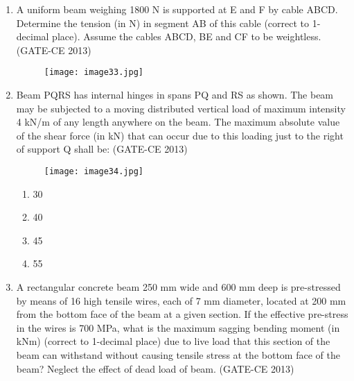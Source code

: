 \documentclass[journal,12pt,onecolumn]{article}
\theoremstyle{remark}
\begin{document}
\begin{enumerate}
    \item A uniform beam weighing 1800 N is supported at E and F by cable ABCD. Determine the tension (in N) in segment AB of this cable (correct to 1-decimal place). Assume the cables ABCD, BE and CF to be weightless. \underline{\hspace{3cm}} (GATE-CE 2013)
    
    \begin{figure}[H]
    \centering
    \texttt{[image: image33.jpg]}  
    \caption{}
    \label{fig:4}
    \end{figure}
    
    \item Beam PQRS has internal hinges in spans PQ and RS as shown. The beam may be subjected to a moving distributed vertical load of maximum intensity 4 kN/m of any length anywhere on the beam. The maximum absolute value of the shear force (in kN) that can occur due to this loading just to the right of support Q shall be: (GATE-CE 2013)
    \begin{figure}[H]
    \centering
    \texttt{[image: image34.jpg]}  
    \caption{}
    \label{fig:5}
    \end{figure}
    \begin{multicols}{4}
    \begin{enumerate}
        \item 30 
        \item 40 
        \item 45 
        \item 55
    \end{enumerate}
    \end{multicols}
    
    \item A rectangular concrete beam 250 mm wide and 600 mm deep is pre-stressed by means of 16 high tensile wires, each of 7 mm diameter, located at 200 mm from the bottom face of the beam at a given section. If the effective pre-stress in the wires is 700 MPa, what is the maximum sagging bending moment (in kNm) (correct to 1-decimal place) due to live load that this section of the beam can withstand without causing tensile stress at the bottom face of the beam? Neglect the effect of dead load of beam. \underline{\hspace{3cm}} (GATE-CE 2013)
    

\end{enumerate}
\end{document}
